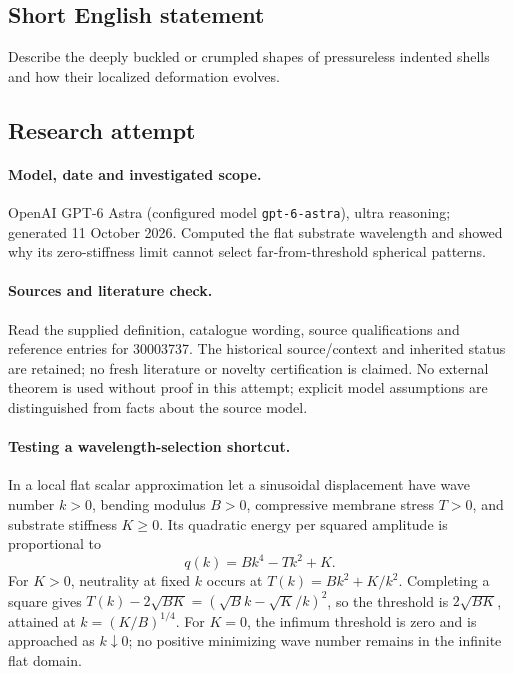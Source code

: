 \documentclass[11pt]{article}
\begin{document}
\subsection{Short English statement}
Describe the deeply buckled or crumpled shapes of pressureless indented shells and how their localized deformation evolves.
\subsection{Research attempt}
\paragraph{Model, date and investigated scope.}
OpenAI GPT-6 Astra (configured model \texttt{gpt-6-astra}), ultra reasoning; generated 11 October 2026. Computed the flat substrate wavelength and showed why its zero-stiffness limit cannot select far-from-threshold spherical patterns.

\paragraph{Sources and literature check.}
Read the supplied definition, catalogue wording, source qualifications and reference entries for 30003737. The historical source/context and inherited status are retained; no fresh literature or novelty certification is claimed. No external theorem is used without proof in this attempt; explicit model assumptions are distinguished from facts about the source model.

\paragraph{Testing a wavelength-selection shortcut.} In a local flat scalar approximation let a sinusoidal displacement have wave number \(k>0\), bending modulus \(B>0\), compressive membrane stress \(T>0\), and substrate stiffness \(K\ge0\). Its quadratic energy per squared amplitude is proportional to
\[
 q(k)=Bk^4-Tk^2+K.
\]
For \(K>0\), neutrality at fixed \(k\) occurs at \(T(k)=Bk^2+K/k^2\). Completing a square gives \(T(k)-2\sqrt{BK}=(\sqrt Bk-\sqrt K/k)^2\), so the threshold is \(2\sqrt{BK}\), attained at \(k=(K/B)^{1/4}\). For \(K=0\), the infimum threshold is zero and is approached as \(k\downarrow0\); no positive minimizing wave number remains in the infinite flat domain.
\end{document}
